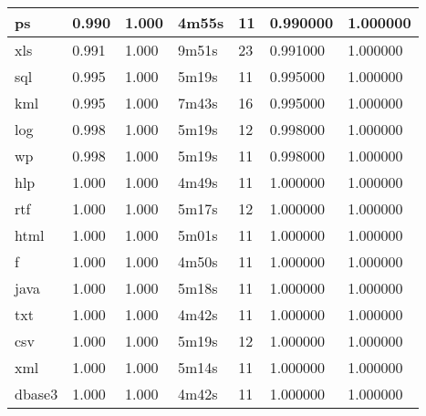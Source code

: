 \begin{table}[!ht]
\begin{tabular}{|l|l|l|l|l|l|l|}
ps       & 0.990           & 1.000          & 4m55s  & 11     & 0.990000  & 1.000000         \\ \hline
xls      & 0.991           & 1.000          & 9m51s  & 23     & 0.991000  & 1.000000         \\ \hline
sql      & 0.995           & 1.000          & 5m19s  & 11     & 0.995000  & 1.000000         \\ \hline
kml      & 0.995           & 1.000          & 7m43s  & 16     & 0.995000  & 1.000000         \\ \hline
log      & 0.998           & 1.000          & 5m19s  & 12     & 0.998000  & 1.000000         \\ \hline
wp       & 0.998           & 1.000          & 5m19s  & 11     & 0.998000  & 1.000000         \\ \hline
hlp      & 1.000           & 1.000          & 4m49s  & 11     & 1.000000  & 1.000000         \\ \hline
rtf      & 1.000           & 1.000          & 5m17s  & 12     & 1.000000  & 1.000000         \\ \hline
html     & 1.000           & 1.000          & 5m01s  & 11     & 1.000000  & 1.000000         \\ \hline
f        & 1.000           & 1.000          & 4m50s  & 11     & 1.000000  & 1.000000         \\ \hline
java     & 1.000           & 1.000          & 5m18s  & 11     & 1.000000  & 1.000000         \\ \hline
txt      & 1.000           & 1.000          & 4m42s  & 11     & 1.000000  & 1.000000         \\ \hline
csv      & 1.000           & 1.000          & 5m19s  & 12     & 1.000000  & 1.000000         \\ \hline
xml      & 1.000           & 1.000          & 5m14s  & 11     & 1.000000  & 1.000000         \\ \hline
dbase3   & 1.000           & 1.000          & 4m42s  & 11     & 1.000000  & 1.000000         \\ \hline
\end{tabular}
\end{table}
